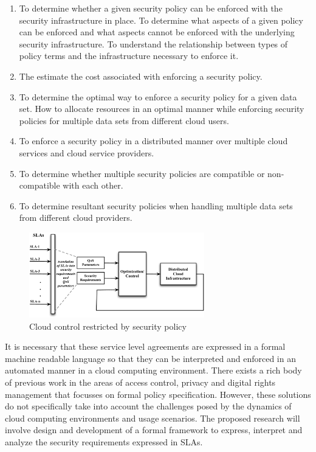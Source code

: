 \documentclass[times, 10pt,twocolumn]{article}
\begin{document}
\begin{enumerate}
\item To determine whether a given security policy can be enforced with the security infrastructure in place. To determine what aspects of a given policy can be enforced and what aspects cannot be enforced with the underlying security infrastructure. To understand the relationship between types of policy terms  and the infrastructure necessary to enforce it. 
\item The estimate the cost associated with enforcing a security policy.
\item To determine the optimal way to enforce a security policy for a given data set. How to allocate resources in an optimal manner while enforcing security policies for multiple data sets from different cloud users. 
\item To enforce a security policy in a distributed manner over multiple cloud services and cloud service providers.
\item To determine whether multiple security policies are compatible or non-compatible with each other.
\item To determine resultant security policies when handling multiple data sets from different cloud providers.
\end{enumerate}

\begin{figure}[!t]
\centering
\includegraphics[width=3in]{cloud-security.pdf}
\caption{Cloud control restricted by security policy}
\label{fig:cloud-security}
\end{figure}

It is necessary that these service level agreements are expressed in a formal machine readable language so that they can be interpreted and enforced in an automated manner in a cloud computing environment. There exists a rich body of previous work in the areas of access control, privacy and digital rights management that focusses on formal policy specification. However,  these solutions do not specifically take into account the challenges posed by the dynamics of cloud computing environments and usage scenarios. The proposed research will involve design and development of a formal framework to express, interpret and analyze the security requirements expressed in SLAs. 
\end{document}
